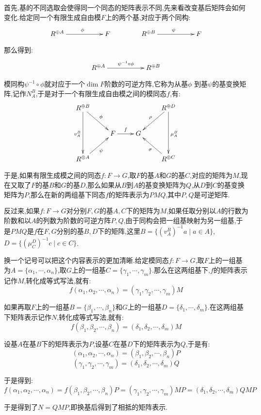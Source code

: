 首先,基的不同选取会使得同一个同态的矩阵表示不同,先来看改变基后矩阵会如何变化.给定同一个有限生成自由模$F$上的两个基,对应于两个同构:
$$\xymatrix{
	R^{\oplus A}\ar[rr]^{\phi}&&F
}\qquad\qquad
\xymatrix{
	R^{\oplus B}\ar[rr]^{\psi}&&F
}
$$

那么得到:
$$\xymatrix{
	R^{\oplus A}\ar[rr]^{\psi^{-1}\circ\phi}&&R^{\oplus B}
}
$$

模同构$\psi^{-1}\circ\phi$就对应于一个$\dim F$阶数的可逆方阵,它称为从基$\phi$ 到基$\psi$的基变换矩阵,记作$N_A^B$,于是对于一个有限生成自由模之间的模同态$f$,有:
$$\xymatrix{
	R^{\oplus B}\ar[dr]^{\phi}\ar[dd]_{v_A^B}&&&R^{\oplus D}\ar[dl]_{\rho}\ar[dd]^{\mu_A^B}\\
	&F\ar[r]^{f}&G&\\
	R^{\oplus A}\ar[ur]_{\psi}&&&R^{\oplus C}\ar[ul]^{\sigma}
}$$

于是,如果有限生成模之间的同态$f:F\to G$,取$F$的基$A$和$G$的基$C$,对应的矩阵为$M$,现在又取了$F$的基$B$和$G$的基$D$,那么如果从$B$到$A$的基变换矩阵为$Q$,从$D$到$C$的基变换矩阵为$P$,那么在新的两组基下同态$f$的矩阵表示为$PMQ$,其中$P,Q$是可逆矩阵.

反过来,如果$f:F\to G$对分别$F,G$的基$A,C$下的矩阵为$M$,如果任取分别以$A$的行数为阶数和以$A$的列数为阶数的可逆方阵$P,Q$,由于同构会把一组基映射为另一组基,于是$PMQ$是$f$在$F,G$分别的基$B,D$下的矩阵,这里$B=\{(v_A^B)^{-1}a\mid a\in A\}$,$D=\{(\mu_C^D)^{-1}c\mid c\in C\}$.

换一个记号可以把这个内容表示的更加清晰.给定模同态$f:F\to G$,取$F$上的一组基为$A=\{\alpha_1,\cdots,\alpha_n\}$,取$G$上的一组基$C=\{\gamma_1,\cdots,\gamma_m\}$.那么在这两组基下,$f$的矩阵表示记作$M$,转化成等式写法,就有:
$$f(\alpha_1,\alpha_2,\cdots,\alpha_n)=(\gamma_1,\gamma_2,\cdots,\gamma_m)M$$

如果再取$F$上的一组基$B=\{\beta_1,\cdots,\beta_n\}$和$G$上的一组基$D=\{\delta_1,\cdots,\delta_m\}$.在这两组基下矩阵表示记作$N$,转化成等式写法,就有:
$$f(\beta_1,\beta_2,\cdots,\beta_n)=(\delta_1,\delta_2,\cdots,\delta_m)M$$

设基$A$在基$B$下的矩阵表示为$P$,设基$C$在基$D$下的矩阵表示为$Q$,于是有:
$$(\alpha_1,\alpha_2,\cdots,\alpha_n)=(\beta_1,\beta_2,\cdots,\beta_n)P$$
$$(\gamma_1,\gamma_2,\cdots,\gamma_m)=(\delta_1,\delta_2,\cdots,\delta_m)Q$$

于是得到:
$$f(\alpha_1,\alpha_2,\cdots,\alpha_n)=f(\beta_1,\beta_2,\cdots,\beta_n)P=(\gamma_1,\gamma_2,\cdots,\gamma_m)MP
=(\delta_1,\delta_2,\cdots,\delta_m)QMP$$

于是得到了$N=QMP$,即换基后得到了相抵的矩阵表示.


